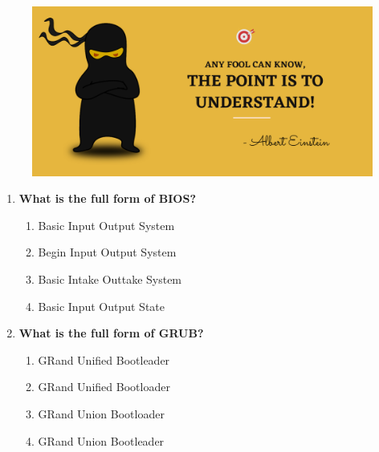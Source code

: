 \setlength{\columnsep}{3pt}
\begin{flushleft}
	
	\paragraph{}
	\bigskip
	
	\begin{figure}[h!]
		\centering
		\includegraphics[scale=.2]{content/practise.jpg}
	\end{figure}	
	\begin{enumerate}
		
		\item \textbf{What is the full form of BIOS?}
		\begin{enumerate}[label=(\alph*)]
			\item Basic Input Output System    %
			\item Begin Input Output System
			\item Basic Intake Outtake System
			\item Basic Input Output State
		\end{enumerate}
		\bigskip
		\bigskip	

		\item \textbf{What is the full form of GRUB?}
		\begin{enumerate}[label=(\alph*)]
			\item GRand Unified Bootleader    
			\item GRand Unified Bootloader   %
			\item GRand Union Bootloader
			\item GRand Union Bootleader
		\end{enumerate}
		\bigskip
		\bigskip	
		

\end{enumerate}
\end{flushleft}
